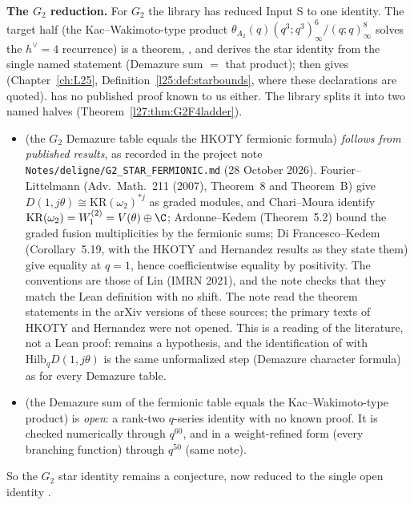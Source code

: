 \textbf{The $G_2$ reduction.} For $G_2$ the library has reduced Input S to one identity. The target half  (the
Kac--Wakimoto-type product $\theta_{A_2}(q)(q^3;q^3)_\infty^6/(q;q)_\infty^8$ solves the $h^\vee=4$ recurrence) is a theorem,
, and  derives the star identity from the single named
statement  (Demazure sum $=$ that product);  then gives 
(Chapter~\ref{ch:L25}, Definition~\ref{l25:def:starbounds}, where these declarations are quoted).  has no
published proof known to us either. The library splits it into two named halves (Theorem~\ref{l27:thm:G2F4ladder}).
\begin{itemize}
\item {} (the $G_2$ Demazure table equals the HKOTY fermionic formula) \emph{follows from published
  results}, as recorded in the project note \texttt{Notes/deligne/G2\_STAR\_FERMIONIC.md} (28 October 2026). Fourier--Littelmann
  (Adv.\ Math.\ 211 (2007), Theorem~8 and Theorem~B) give $D(1,j\theta)\cong\mathrm{KR}(\omega_2)^{*j}$ as graded modules, and
  Chari--Moura identify $\mathrm{KR}(\omega_2)=W^{(2)}_1=V(\theta)\oplus\C$; Ardonne--Kedem (Theorem~5.2) bound the graded fusion
  multiplicities by the fermionic sums; Di Francesco--Kedem (Corollary~5.19, with the HKOTY and Hernandez results as they state
  them) give equality at $q=1$, hence coefficientwise equality by positivity. The conventions are those of Lin (IMRN 2021), and the
  note checks that they match the Lean definition with no shift. The note read the theorem statements in the arXiv versions of
  these sources; the primary texts of HKOTY and Hernandez were not opened. This is a reading of the literature, not a Lean proof:
   remains a hypothesis, and the identification of  with
  $\mathrm{Hilb}_q D(1,j\theta)$ is the same unformalized step (Demazure character formula) as for every Demazure table.
\item {} (the Demazure sum of the fermionic table equals the Kac--Wakimoto-type product) is \emph{open}: a
  rank-two $q$-series identity with no known proof. It is checked numerically through $q^{60}$, and in a weight-refined form
  (every branching function) through $q^{50}$ (same note).
\end{itemize}
So the $G_2$ star identity remains a conjecture, now reduced to the single open identity .

